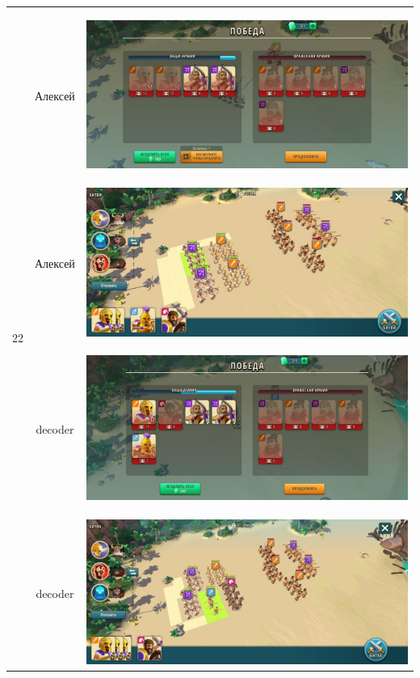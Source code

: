 \begin{longtable}{|c|c|c|}
	\hline
	\multirow{6}{*}{22} & Алексей &
	\hypertarget{fight22}{\includegraphics[width=0.75\linewidth]{./parts/media/TreasureHunt/22/alexey/photo_2022-04-13_16-28-21.jpg}} \\
	& Алексей &
	\includegraphics[width=0.75\linewidth]{./parts/media/TreasureHunt/22/alexey/photo_2022-04-13_16-28-31.jpg} \\
	\hline
	\multirow{6}{*}{22} & decoder &
	\hypertarget{fight22}{\includegraphics[width=0.75\linewidth]{./parts/media/TreasureHunt/22/decoder/photo_2022-04-13_16-27-45.jpg}} \\
	& decoder &
	\includegraphics[width=0.75\linewidth]{./parts/media/TreasureHunt/22/decoder/photo_2022-04-13_16-27-22.jpg} \\

\end{longtable}
